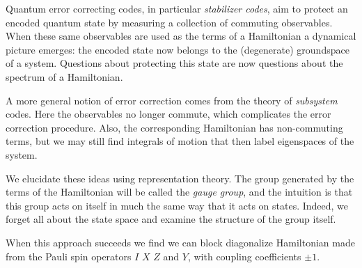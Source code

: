 \documentclass[12pt,notitlepage,longbibliography,nofootinbib,tightenlines]{revtex4}
\begin{document}
Quantum error correcting codes,
in particular {\it stabilizer codes},
aim to protect an encoded quantum state
by measuring a collection of commuting
observables.
When these same observables are used as
the terms of a Hamiltonian
a dynamical picture emerges: the
encoded state now belongs to the
(degenerate) groundspace of a
system. Questions about protecting
this state are now questions about
the spectrum of a Hamiltonian.

A more general notion of error correction
comes from the theory of {\it
subsystem} codes. 
Here the observables
no longer commute, which complicates
the error correction procedure.
Also, the corresponding Hamiltonian
has non-commuting terms, but
we may still find integrals of
motion that then label eigenspaces
of the system.

We elucidate these ideas using representation theory. 
The group generated by the terms of the Hamiltonian
will be called the {\it gauge group},
and the intuition is that this
group acts on itself in much the same way
that it acts on states. 
Indeed, we forget all about the state space and
examine the structure of the group itself.

When this approach succeeds we find we can
block diagonalize Hamiltonian made from 
the Pauli spin operators
$I$ $X$ $Z$ and $Y$, with coupling coefficients
$\pm 1.$
\end{document}
